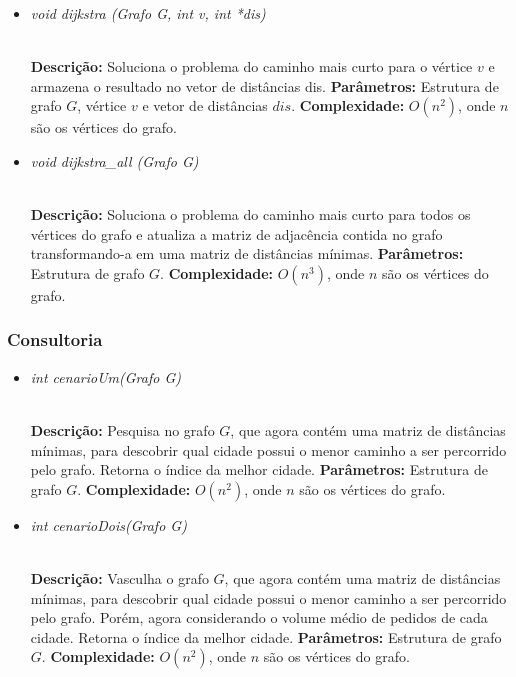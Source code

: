 \documentclass[12pt]{article}
\begin{document}
\begin{itemize}
 \item \begin{large}\textit{void dijkstra (Grafo G, int v,  int *dis)}\end{large}\\
 \subitem \textbf{Descrição:} Soluciona o problema do caminho mais curto para o vértice $v$ e armazena o resultado no vetor de distâncias dis.
 \subitem \textbf{Parâmetros:} Estrutura de grafo $G$, vértice $v$ e vetor de distâncias $dis$.
 \subitem \textbf{Complexidade:} $O(n^2)$, onde $n$ são os vértices do grafo.
\end{itemize}

\vspace{0.2 true cm}

\begin{itemize}
 \item \begin{large}\textit{void dijkstra\_all (Grafo G)}\end{large}\\
 \subitem \textbf{Descrição:} Soluciona o problema do caminho mais curto para todos os vértices do grafo e atualiza a matriz de adjacência contida no grafo transformando-a em uma matriz de distâncias mínimas.
 \subitem \textbf{Parâmetros:} Estrutura de grafo $G$.
 \subitem \textbf{Complexidade:} $O(n^3)$, onde $n$ são os vértices do grafo.
\end{itemize}


\subsubsection{Consultoria}

\begin{itemize}
 \item \begin{large}\textit{int cenarioUm(Grafo G)}\end{large}\\
 \subitem \textbf{Descrição:} Pesquisa no grafo $G$, que agora contém uma matriz de distâncias mínimas, para descobrir qual cidade possui o menor caminho a ser percorrido pelo grafo. Retorna o índice da melhor cidade.
 \subitem \textbf{Parâmetros:} Estrutura de grafo $G$.
 \subitem \textbf{Complexidade:} $O(n^2)$, onde $n$ são os vértices do grafo.
\end{itemize}

\vspace{0.2 true cm}

\begin{itemize}
 \item \begin{large}\textit{int cenarioDois(Grafo G)}\end{large}\\
 \subitem \textbf{Descrição:} Vasculha o grafo $G$, que agora contém uma matriz de distâncias mínimas, para descobrir qual cidade possui o menor caminho a ser percorrido pelo grafo. Porém, agora considerando o volume médio de pedidos de cada cidade. Retorna o índice da melhor cidade.
 \subitem \textbf{Parâmetros:} Estrutura de grafo $G$.
 \subitem \textbf{Complexidade:} $O(n^2)$, onde $n$ são os vértices do grafo.
\end{itemize}
\end{document}
